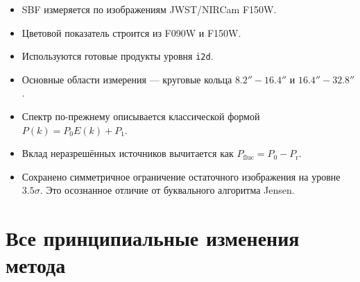 \documentclass[12pt,a4paper]{article}
\begin{document}
\begin{itemize}
    \item SBF измеряется по изображениям JWST/NIRCam F150W.
    \item Цветовой показатель строится из F090W и F150W.
    \item Используются готовые продукты уровня \texttt{i2d}.
    \item Основные области измерения --- круговые кольца
    \(8.2''\!-\!16.4''\) и \(16.4''\!-\!32.8''\).
    \item Спектр по-прежнему описывается классической формой
    \(P(k)=P_0E(k)+P_1\).
    \item Вклад неразрешённых источников вычитается как
    \(P_{\mathrm{fluc}}=P_0-P_{\mathrm r}\).
    \item Сохранено симметричное ограничение остаточного
    изображения на уровне \(3.5\sigma\). Это осознанное
    отличие от буквального алгоритма Jensen.
\end{itemize}

\section{Все принципиальные изменения метода}
\end{document}
